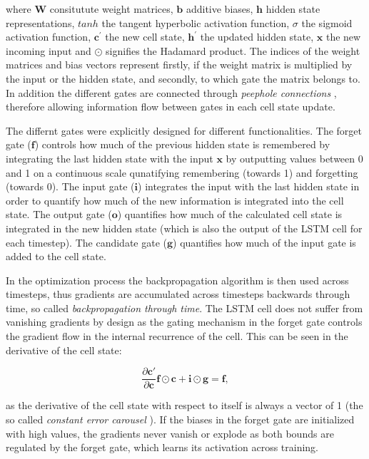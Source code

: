 \documentclass[12pt]{article}
\begin{document}
where $\mathbf{W}$ consitutute weight matrices, $\mathbf{b}$ additive biases, $\mathbf{h}$ hidden state representations, $tanh$ the tangent hyperbolic activation function, $\sigma$ the sigmoid activation function, $\mathbf{c^{\prime}}$ the new cell state, $\mathbf{h^{\prime}}$ the updated hidden state, $\mathbf{x}$ the new incoming input and $\odot$ signifies the Hadamard product. The indices of the weight matrices and bias vectors represent firstly, if the weight matrix is multiplied by the input or the hidden state, and secondly, to which gate the matrix belongs to. In addition the different gates are connected through \textit{peephole connections} \citep{gers2002learning}, therefore allowing information flow between gates in each cell state update. 

The differnt gates were explicitly designed for different functionalities.  The forget gate ($\mathbf{f}$) controls how much of the previous hidden state is remembered by integrating the last hidden state with the input $\mathbf{x}$ by outputting values between 0  and 1 on a continuous scale qunatifying remembering (towards 1) and forgetting (towards 0). The input gate ($\mathbf{i}$) integrates the input with the last hidden state in order to quantify how much of the new information is integrated into the cell state. The output gate ($\mathbf{o}$) quantifies how much of the calculated cell state is integrated in the new hidden state (which is also the output of the LSTM cell for each timestep). The candidate gate ($\mathbf{g}$) quantifies how much of the input gate is added to the cell state.

In the optimization process the backpropagation algorithm is then used across timesteps, thus gradients are accumulated across timesteps backwards through time, so called \textit{backpropagation through time}. The LSTM cell does not suffer from vanishing gradients by design as the gating mechanism in the forget gate controls the gradient flow in the internal recurrence of the cell. This can be seen in the derivative of the cell state: 

\begin{equation}
	\frac{\partial \mathbf{c'}}{\partial \mathbf{c}} \mathbf{f} \odot \mathbf{c} + \mathbf{i} \odot \mathbf{g} = \mathbf{f},
\end{equation}

as the derivative of the cell state with respect to itself is always a vector of 1 (the so called \textit{constant error carousel} \citep{hochreiter1997long}). If the biases in the forget gate are initialized with high values, the gradients never vanish or explode as both bounds are regulated by the forget gate, which learns its activation across training. 
\end{document}

